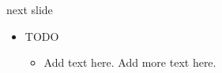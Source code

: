 \begin{Slide}{next slide}
\begin{itemize}
\item TODO
\begin{itemize}
\item Add text here. Add more text here.
\end{itemize}
\end{itemize}
\end{Slide}